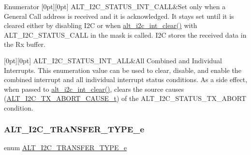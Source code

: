 \begin{DoxyEnumFields}{Enumerator}
[0pt][0pt]{}\mbox{\label{group__ALT__I2C_gga229c6d995595615ca923ecc8b6490603ab1c1569f2060691e867c1a53ce578525}} 
A\+L\+T\+\_\+\+I2\+C\+\_\+\+S\+T\+A\+T\+U\+S\+\_\+\+I\+N\+T\+\_\+\+C\+A\+LL&Set only when a General Call address is received and it is acknowledged. It stays set until it is cleared either by disabling I2C or when \mbox{\hyperlink{group__ALT__I2C__INT_gae00500b27051a82ff75905e777f0e1c8}{alt\+\_\+i2c\+\_\+int\+\_\+clear()}} with A\+L\+T\+\_\+\+I2\+C\+\_\+\+S\+T\+A\+T\+U\+S\+\_\+\+C\+A\+LL in the mask is called. I2C stores the received data in the Rx buffer. \\
\hline

[0pt][0pt]{}\mbox{\label{group__ALT__I2C_gga229c6d995595615ca923ecc8b6490603ab87517d404a73d013623aadecf758a7e}} 
A\+L\+T\+\_\+\+I2\+C\+\_\+\+S\+T\+A\+T\+U\+S\+\_\+\+I\+N\+T\+\_\+\+A\+LL&All Combined and Individual Interrupts. This enumeration value can be used to clear, disable, and enable the combined interrupt and all individual interrupt status conditions. As a side effect, when passed to \mbox{\hyperlink{group__ALT__I2C__INT_gae00500b27051a82ff75905e777f0e1c8}{alt\+\_\+i2c\+\_\+int\+\_\+clear()}}, clears the source causes (\mbox{\hyperlink{group__ALT__I2C_gae7ca3bb5e96b3425588a975987407738}{A\+L\+T\+\_\+\+I2\+C\+\_\+\+T\+X\+\_\+\+A\+B\+O\+R\+T\+\_\+\+C\+A\+U\+S\+E\+\_\+t}}) of the A\+L\+T\+\_\+\+I2\+C\+\_\+\+S\+T\+A\+T\+U\+S\+\_\+\+T\+X\+\_\+\+A\+B\+O\+RT condition. \\
\hline

\end{DoxyEnumFields}
\mbox{\label{group__ALT__I2C_gab45046fdc6d7cbe49fc048f26fd88719}} 
\subsubsection{\texorpdfstring{ALT\_I2C\_TRANSFER\_TYPE\_e}{ALT\_I2C\_TRANSFER\_TYPE\_e}}
{\footnotesize\ttfamily enum \mbox{\hyperlink{group__ALT__I2C_gab45046fdc6d7cbe49fc048f26fd88719}{A\+L\+T\+\_\+\+I2\+C\+\_\+\+T\+R\+A\+N\+S\+F\+E\+R\+\_\+\+T\+Y\+P\+E\+\_\+e}}}

